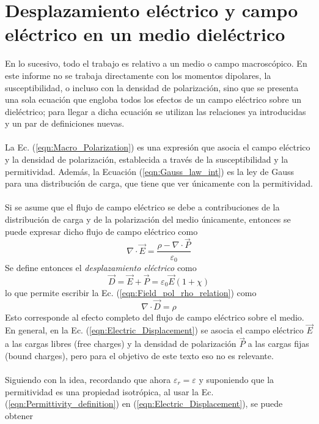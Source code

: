 \documentclass[12pt, oneside, numbers, spanish]{ezthesis}
\numberwithin{equation}{section}
\begin{document}
\section{Desplazamiento eléctrico y campo eléctrico en un medio dieléctrico}\label{Sec:Elec_Displacement}
En lo sucesivo, todo el trabajo es relativo a un medio o campo macroscópico. En este informe no se trabaja directamente con los momentos dipolares, la susceptibilidad, o incluso con la densidad de polarización, sino que se presenta una sola ecuación que engloba todos los efectos de un campo eléctrico sobre un dieléctrico; para llegar a dicha ecuación se utilizan las relaciones ya introducidas y un par de definiciones nuevas.\\\\
La Ec. (\ref{eqn:Macro_Polarization}) es una expresión que asocia el campo eléctrico y la densidad de polarización, establecida a través de la susceptibilidad y la permitividad. Además, la Ecuación (\ref{eqn:Gauss_law_int}) es la ley de Gauss para una distribución de carga, que tiene que ver únicamente con la permitividad.\\\\
Si se asume que el flujo de campo eléctrico se debe a contribuciones de la distribución de carga y de la polarización del medio únicamente, entonces se puede expresar dicho flujo de campo eléctrico como
\begin{equation}\label{eqn:Field_pol_rho_relation}
\nabla\cdot\vec{E} = \frac{\rho - \nabla\cdot\vec{P}}{\varepsilon_0}
\end{equation}
Se define entonces el \textit{desplazamiento eléctrico} como
\begin{equation}\label{eqn:Electric_Displacement}
\vec{D} = \vec{E} + \vec{P} = \varepsilon_0\vec{E}(1 + \chi)
\end{equation}
lo que permite escribir la Ec. (\ref{eqn:Field_pol_rho_relation}) como
\begin{equation}
\nabla\cdot\vec{D} = \rho
\end{equation}
Esto corresponde al efecto completo del flujo de campo eléctrico sobre el medio. En general, en la Ec. (\ref{eqn:Electric_Displacement}) se asocia el campo eléctrico $\vec{E}$ a las cargas libres (free charges) y la densidad de polarización $\vec{P}$ a las cargas fijas (bound charges), pero para el objetivo de este texto eso no es relevante.\\\\
Siguiendo con la idea, recordando que ahora $\varepsilon_r = \varepsilon$ y suponiendo que la permitividad es una propiedad isotrópica, al usar la Ec. (\ref{eqn:Permittivity_definition}) en (\ref{eqn:Electric_Displacement}), se puede obtener
\end{document}
